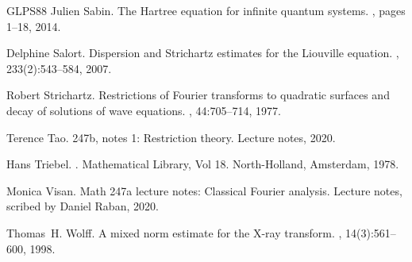 \documentclass[11pt,a4paper,reqno]{amsart}
\theoremstyle{plain}
\theoremstyle{remark}
\begin{document}
\begin{thebibliography}{GLPS88}
Julien Sabin.
\newblock The {H}artree equation for infinite quantum systems.
, pages 1--18, 2014.

Delphine Salort.
\newblock Dispersion and {S}trichartz estimates for the {L}iouville equation.
, 233(2):543--584, 2007.

Robert Strichartz.
\newblock Restrictions of {F}ourier transforms to quadratic surfaces and decay of solutions of wave equations.
, 44:705--714, 1977.

Terence Tao.
\newblock 247b, notes 1: Restriction theory.
\newblock Lecture notes, 2020.

Hans Triebel.
.
\newblock Mathematical Library, Vol 18. North-Holland, Amsterdam, 1978.

Monica Visan.
\newblock Math 247a lecture notes: Classical {Fourier} analysis.
\newblock Lecture notes, scribed by Daniel Raban, 2020.

Thomas~H. Wolff.
\newblock A mixed norm estimate for the {X}-ray transform.
, 14(3):561--600, 1998.

\end{thebibliography}
\end{document}
